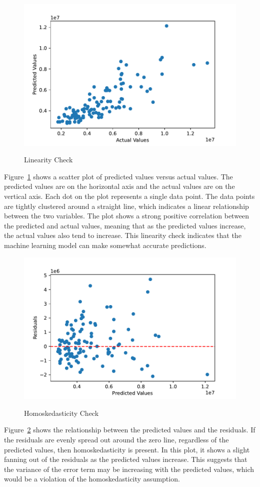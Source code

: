 \documentclass[12pt]{article}
\begin{document}
\begin{figure}[h!]
    \caption{Linearity Check}
    \includegraphics[width=1\textwidth]{linearity_check.pdf}
    \label{fig:linearity_check}
\end{figure}
Figure~\ref{fig:linearity_check} shows a scatter plot of predicted values versus actual values. The predicted values are on the horizontal axis and the actual values are on the vertical axis. Each dot on the plot represents a single data point. The data points are tightly clustered around a straight line, which indicates a linear relationship between the two variables. The plot shows a strong positive correlation between the predicted and actual values, meaning that as the predicted values increase, the actual values also tend to increase. This linearity check indicates that the machine learning model can make somewhat accurate predictions. 

\begin{figure}[h!]
    \caption{Homoskedasticity Check}
    \includegraphics[width=1\textwidth]{homoskedasticity_check.pdf}
    \label{fig:homoskedasticity_check}
\end{figure}
Figure~\ref{fig:homoskedasticity_check} shows the relationship between the predicted values and the residuals. If the residuals are evenly spread out around the zero line, regardless of the predicted values, then homoskedasticity is present. In this plot, it shows a slight fanning out of the residuals as the predicted values increase. This suggests that the variance of the error term may be increasing with the predicted values, which would be a violation of the homoskedasticity assumption. 
\end{document}
